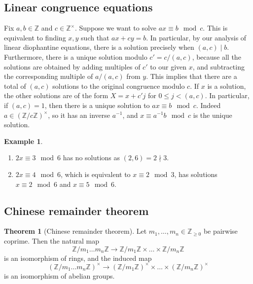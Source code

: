 \documentclass{article}
\newcommand{\Z}{\mathbb{Z}}
\newcommand{\rb}[1]{\left( #1 \right)}
\newcommand{\unit}[1]{\rb{\Z / #1\Z}^\times}
\theoremstyle{definition}\newtheorem{definition}{Definition}
\theoremstyle{definition}\newtheorem{remark}[definition]{Remark}
\theoremstyle{definition}\newtheorem*{example}{Example}
\theoremstyle{definition}\newtheorem*{note}{Note}
\newtheorem{theorem}[definition]{Theorem}
\begin{document}

\subsection{Linear congruence equations}

Fix $ a, b \in \Z $ and $ c \in \Z^\times $. Suppose we want to solve $ ax \equiv b \mod c $. This is equivalent to finding $ x, y $ such that $ ax + cy = b $. In particular, by our analysis of linear diophantine equations, there is a solution precisely when $ \rb{a, c} \mid b $. Furthermore, there is a unique solution modulo $ c' = c / \rb{a, c} $, because all the solutions are obtained by adding multiples of $ c' $ to our given $ x $, and subtracting the corresponding multiple of $ a / \rb{a, c} $ from $ y $. This implies that there are a total of $ \rb{a, c} $ solutions to the original congruence modulo $ c $. If $ x $ is a solution, the other solutions are of the form $ X = x + c'j $ for $ 0 \le j < \rb{a, c} $. In particular, if $ \rb{a, c} = 1 $, then there is a unique solution to $ ax \equiv b \mod c $. Indeed $ a \in \unit{c} $, so it has an inverse $ a^{-1} $, and $ x \equiv a^{-1}b \mod c $ is the unique solution.

\begin{example}
\hfill
\begin{enumerate}
\item $ 2x \equiv 3 \mod 6 $ has no solutions as $ \rb{2, 6} = 2 \nmid 3 $.
\item $ 2x \equiv 4 \mod 6 $, which is equivalent to $ x \equiv 2 \mod 3 $, has solutions $ x \equiv 2 \mod 6 $ and $ x \equiv 5 \mod 6 $.
\end{enumerate}

\end{example}

\subsection{Chinese remainder theorem}

\begin{theorem}[Chinese remainder theorem]
Let $ m_1, \dots, m_n \in \Z_{\ge 0} $ be pairwise coprime. Then the natural map
$$ \Z / m_1 \dots m_n\Z \to \Z / m_1\Z \times \dots \times \Z / m_n\Z $$
is an isomorphism of rings, and the induced map
$$ \unit{m_1 \dots m_n} \to \unit{m_1} \times \dots \times \unit{m_n} $$
is an isomorphism of abelian groups.
\end{theorem}
\end{document}
